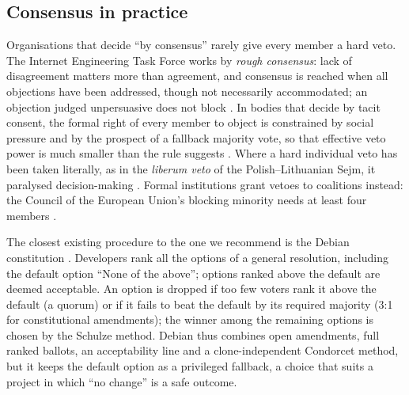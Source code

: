 \subsection{Consensus in practice}

Organisations that decide ``by consensus'' rarely give every member a hard veto. The Internet
Engineering Task Force works by \emph{rough consensus}: lack of disagreement matters more than agreement,
and consensus is reached when all objections have been addressed, though not necessarily accommodated;
an objection judged unpersuasive does not block \citep[\S\S2--3]{Resnick2014rfc7282}. In bodies that
decide by tacit consent, the formal right of every member to object is constrained by social pressure
and by the prospect of a fallback majority vote, so that effective veto power is much smaller than the
rule suggests \citep{Krick2017}. Where a hard individual veto has been taken literally, as in the
\emph{liberum veto} of the Polish--Lithuanian Sejm, it paralysed decision-making \citep{Rohac2008}.
Formal institutions grant vetoes to coalitions instead: the Council of the European Union's blocking
minority needs at least four members \citep{TEU2016art16}.

The closest existing procedure to the one we recommend is the Debian constitution
\citep[\S A.5]{Debian2024constitution}. Developers rank all the options of a general resolution,
including the default option ``None of the above''; options ranked above the default are deemed
acceptable. An option is dropped if too few voters rank it above the default (a quorum) or if it fails
to beat the default by its required majority (3:1 for constitutional amendments); the winner among the
remaining options is chosen by the Schulze method. Debian thus combines open amendments, full ranked
ballots, an acceptability line and a clone-independent Condorcet method, but it keeps the default
option as a privileged fallback, a choice that suits a project in which ``no change'' is a safe
outcome.

